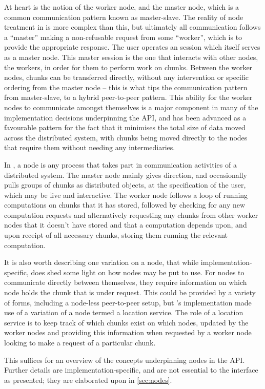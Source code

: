 At heart is the notion of the worker node, and the master node, which is a common communication pattern known as master-slave\cite{rfc2136}.
The reality of node treatment in \lsr{} is more complex than this, but ultimately all communication follows a ``master'' making a non-refusable request from some ``worker'', which is to provide the appropriate response.
The user operates an \R{} session which itself serves as a master node.
This master session is the one that interacts with other nodes, the workers, in order for them to perform work on chunks.
Between the worker nodes, chunks can be transferred directly, without any intervention or specific ordering from the master node -- this is what tips the communication pattern from master-slave, to a hybrid peer-to-peer pattern.
This ability for the worker nodes to communicate amongst themselves is a major component in many of the implementation decisions underpinning the API, and has been advanced as a favourable pattern for the fact that it minimises the total size of data moved across the distributed system, with chunks being moved directly to the nodes that require them without needing any intermediaries.

In \lsr{}, a node is any process that takes part in communication activities of a distributed system.
The master node mainly gives direction, and occasionally pulls groups of chunks as distributed objects, at the specification of the user, which may be live and interactive.
The worker node follows a loop of running computations on chunks that it has stored, followed by checking for any new computation requests and alternatively requesting any chunks from other worker nodes that it doesn't have stored and that a computation depends upon, and upon receipt of all necessary chunks, storing them running the relevant computation.

It is also worth describing one variation on a node, that while implementation-specific, does shed some light on how nodes may be put to use.
For nodes to communicate directly between themselves, they require information on which node holds the chunk that is under request.
This could be provided by a variety of forms, including a node-less peer-to-peer setup, but \lsr{}'s implementation made use of a variation of a node termed a location service.
The role of a location service is to keep track of which chunks exist on which nodes, updated by the worker nodes and providing this information when requested by a worker node looking to make a request of a particular chunk.

This suffices for an overview of the concepts underpinning nodes in the API.
Further details are implementation-specific, and are not essential to the interface as presented; they are elaborated upon in \cref{sec:nodes}.
